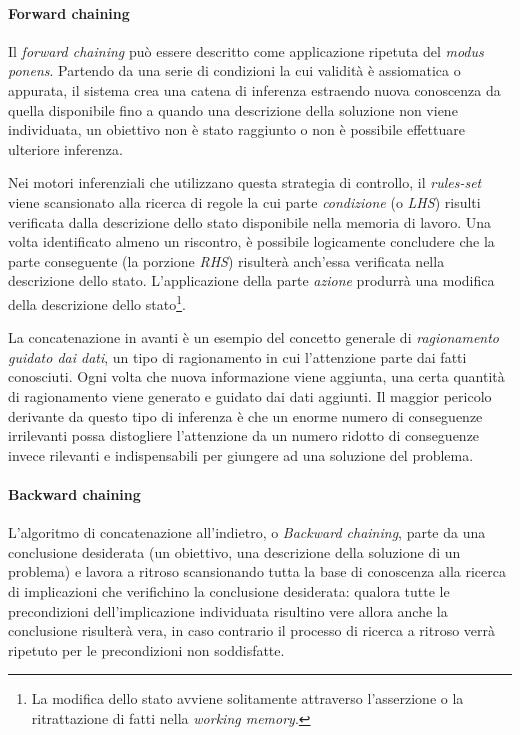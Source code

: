 \paragraph{Forward chaining}
Il \emph{forward chaining} può essere descritto come applicazione ripetuta del \emph{modus ponens}. Partendo da una serie di condizioni la cui validità è assiomatica o appurata, il sistema crea una catena di inferenza estraendo nuova conoscenza da quella disponibile fino a quando una descrizione della soluzione non viene individuata, un obiettivo non è stato raggiunto o non è possibile effettuare ulteriore inferenza.

Nei motori inferenziali che utilizzano questa strategia di controllo, il \emph{rules-set} viene scansionato alla ricerca di regole la cui parte \emph{condizione} (o \emph{LHS}) risulti verificata dalla descrizione dello stato disponibile nella memoria di lavoro. Una volta identificato almeno un riscontro, è possibile logicamente concludere che la parte conseguente (la porzione \emph{RHS}) risulterà anch'essa verificata nella descrizione dello stato. L'applicazione della parte \emph{azione} produrrà una modifica della descrizione dello stato\footnote{La modifica dello stato avviene solitamente attraverso l'asserzione o la ritrattazione di fatti nella \emph{working memory}.}.

La concatenazione in avanti è un esempio del concetto generale di \emph{ragionamento guidato dai dati}, un tipo di ragionamento in cui l'attenzione parte dai fatti conosciuti. Ogni volta che nuova informazione viene aggiunta, una certa quantità di ragionamento viene generato e guidato dai dati aggiunti. Il maggior pericolo derivante da questo tipo di inferenza è che un enorme numero di conseguenze irrilevanti possa distogliere l'attenzione da un numero ridotto di conseguenze invece rilevanti e indispensabili per giungere ad una soluzione del problema.~\cite{russellnorvig2009}

\paragraph{Backward chaining}
L'algoritmo di concatenazione all'indietro, o \emph{Backward chaining}, parte da una conclusione desiderata (un obiettivo, una descrizione della soluzione di un problema) e lavora a ritroso scansionando tutta la base di conoscenza alla ricerca di implicazioni che verifichino la conclusione desiderata: qualora tutte le precondizioni dell'implicazione individuata risultino vere allora anche la conclusione risulterà vera, in caso contrario il processo di ricerca a ritroso verrà ripetuto per le precondizioni non soddisfatte.

